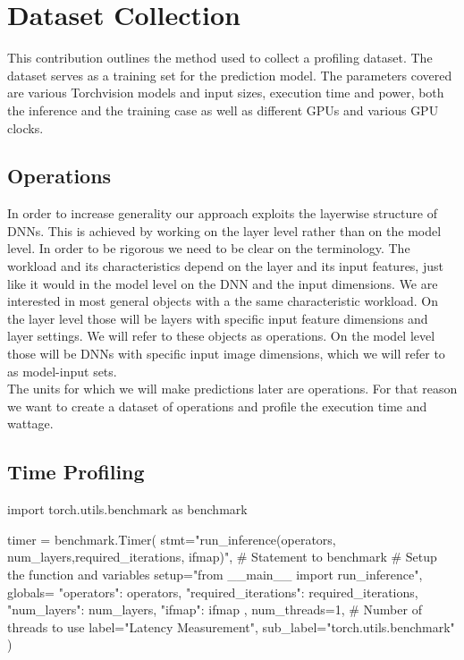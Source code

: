 \chapter{Dataset Collection}\label{chap:contrib1}


This contribution outlines the method used to collect a profiling dataset. The  dataset serves as a training set for the prediction model. The parameters covered are various Torchvision models and input sizes, execution time and power, both the inference and the training case as well as different GPUs and various GPU clocks.


\section{Operations}


In order to increase generality our approach exploits the layerwise structure of DNNs. This is achieved by working on the layer level rather than on the model level. In order to be rigorous we need to be clear on the terminology. The workload and its characteristics depend on the layer and its input features, just like it would in the model level on the DNN and the input dimensions. We are interested in most general objects with a the same characteristic workload. On the layer level those will be layers with specific input feature dimensions and layer settings. We will refer to these objects as operations. On the model level those will be DNNs with specific input image dimensions, which we will refer to as model-input sets. \\
The units for which we will make predictions later are operations. For that reason we want to create a dataset of operations and profile the execution time and wattage. 


\section{Time Profiling}

import torch.utils.benchmark as benchmark

timer = benchmark.Timer(
    stmt="run_inference(operators, num_layers,required_iterations, ifmap)",  # Statement to benchmark  # Setup the function and variables
    setup="from __main__ import run_inference",
    globals={
        "operators": operators,
        "required_iterations": required_iterations,
        "num_layers": num_layers,
        "ifmap": ifmap
    },
    num_threads=1,  # Number of threads to use
    label="Latency Measurement",
    sub_label="torch.utils.benchmark"
)

